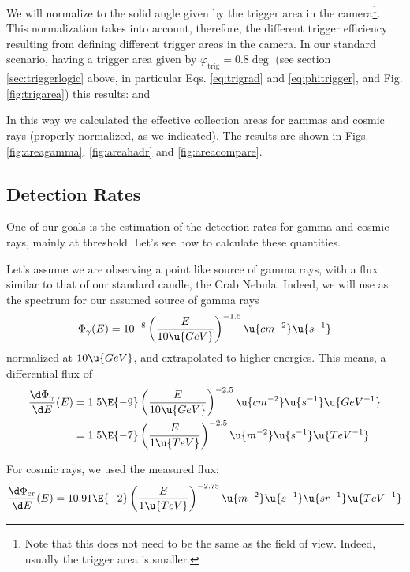 We will normalize to the solid angle given by the trigger area in the
camera\footnote{ Note that this does not need to be the same as the
  field of view. Indeed, usually the trigger area is smaller.}. This
normalization takes into account, therefore, the different trigger
efficiency resulting from defining different trigger areas in the
camera. In our standard scenario, having a trigger area given by
$\varphi_{\mathrm{trig}} = 0.8\deg$ (see section
\ref{sec:triggerlogic} above, in particular Eqs.  \ref{eq:trigrad} and
\ref{eq:phitrigger}, and Fig. \ref{fig:trigarea}) this results:
%
\normsolidangleeq
%
and 
%
\Scrnormeq

In this way we calculated the effective collection areas for gammas
and cosmic rays (properly normalized, as we indicated). The results
are shown in Figs. \ref{fig:areagamma}, \ref{fig:areahadr} and
\ref{fig:areacompare}.

\MORE%

\subsection{Detection Rates}

One of our goals is the estimation of the detection rates for gamma
and cosmic rays, mainly at threshold. Let's see how to calculate these
quantities.

Let's assume we are observing a point like source of gamma rays, with
a flux similar to that of our standard candle, the Crab Nebula.
Indeed, we will use as the spectrum for our assumed source of gamma
rays
%
\begin{equation}
  \label{eq:gFlux}
  \Phi_\gamma(E) = 
  10^{-8} \left(\frac{E}{10\u{GeV}}\right)^{-1.5} 
  \u{cm^{-2}}\u{s^{-1}}
\end{equation}
%
normalized at $10\u{GeV}$, and extrapolated to higher energies.
This means, a differential flux of
%
\begin{eqnarray}
  \label{eq:gdFlux}
  \frac{\d\Phi_\gamma}{\d E}(E) & = 
  1.5\E{-9} \left(\displaystyle\frac{E}{10\u{GeV}}\right)^{-2.5} 
  \u{cm^{-2}}\u{s^{-1}}\u{GeV^{-1}} \\
  ~ & = 1.5\E{-7} \left(\displaystyle\frac{E}{1\u{TeV}}\right)^{-2.5} 
  \u{m^{-2}}\u{s^{-1}}\u{TeV^{-1}} \\ 
\end{eqnarray}

For cosmic rays, we used the measured flux:
%
\begin{equation}
  \label{eq:crFlux}
  \frac{\d\Phi_{\mathrm{cr}}}{\d E}(E) = 
  10.91\E{-2} \left(\frac{E}{1\u{TeV}}\right)^{-2.75} 
  \u{m^{-2}}\u{s^{-1}}\u{sr^{-1}}\u{TeV^{-1}}
\end{equation}

